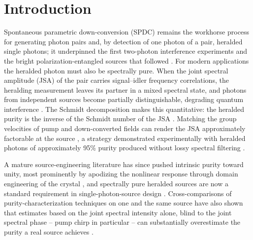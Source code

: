 \section{Introduction}
\label{sec:intro}

Spontaneous parametric down-conversion (SPDC) remains the workhorse
process for generating photon pairs and, by detection of one photon of
a pair, heralded single photons; it underpinned the first two-photon
interference experiments \cite{hong1987} and the bright
polarization-entangled sources that followed \cite{kwiat1995}. For
modern applications the heralded photon must also be spectrally pure.
When the joint spectral amplitude (JSA) of the pair carries
signal--idler frequency correlations, the heralding measurement leaves
its partner in a mixed spectral state, and photons from independent
sources become partially distinguishable, degrading quantum
interference \cite{grice1997}. The Schmidt decomposition makes this
quantitative: the heralded purity is the inverse of the Schmidt number
of the JSA \cite{law2000}. Matching the group velocities of pump and
down-converted fields can render the JSA approximately factorable at
the source \cite{uren2005}, a strategy demonstrated experimentally with heralded
photons of approximately 95\% purity produced without lossy spectral
filtering \cite{mosley2008}.

A mature source-engineering literature has since pushed intrinsic
purity toward unity, most prominently by apodizing the nonlinear
response through domain engineering of the crystal
\cite{branczyk2011,graffitti2018}, and spectrally pure heralded sources
are now a standard requirement in single-photon-source design
\cite{meyerscott2020}. Cross-comparisons of purity-characterization
techniques on one and the same source have also shown that estimates
based on the joint spectral intensity alone, blind to the joint
spectral phase -- pump chirp in particular -- can substantially
overestimate the purity a real source achieves \cite{zielnicki2018}.

